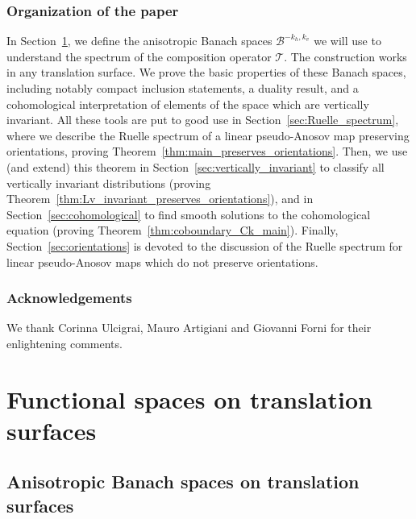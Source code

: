 \documentclass[10pt]{amsart}
\newcommand{\boB}{\mathcal{B}}
\newcommand{\boT}{\mathcal{T}}
\theoremstyle{definition}
\numberwithin{equation}{section}
\begin{document}
\subsubsection*{Organization of the paper}
In Section~\ref{sec:def_boB}, we define the anisotropic Banach spaces
$\boB^{-k_h, k_v}$ we will use to understand the spectrum of the composition
operator $\boT$. The construction works in any translation surface. We prove
the basic properties of these Banach spaces, including notably compact
inclusion statements, a duality result, and a cohomological interpretation of
elements of the space which are vertically invariant. All these tools are put
to good use in Section~\ref{sec:Ruelle_spectrum}, where we describe the
Ruelle spectrum of a linear pseudo-Anosov map preserving orientations,
proving Theorem~\ref{thm:main_preserves_orientations}. Then, we use (and
extend) this theorem in Section~\ref{sec:vertically_invariant} to classify
all vertically invariant distributions (proving
Theorem~\ref{thm:Lv_invariant_preserves_orientations}), and in
Section~\ref{sec:cohomological} to find smooth solutions to the cohomological
equation (proving Theorem~\ref{thm:coboundary_Ck_main}). Finally,
Section~\ref{sec:orientations} is devoted to the discussion of the Ruelle
spectrum for linear pseudo-Anosov maps which do not preserve orientations.

\subsubsection*{Acknowledgements}
We thank Corinna Ulcigrai, Mauro Artigiani and Giovanni Forni for their enlightening comments.

\section{Functional spaces on translation surfaces}
\label{sec:def_boB}

\subsection{Anisotropic Banach spaces on translation surfaces}

\label{subsec:Bkhkv}
\end{document}
